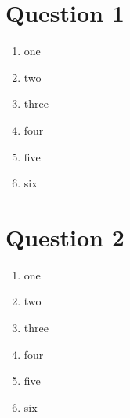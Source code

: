 \documentclass[11pt]{article}
\begin{document}

  \section*{Question 1}

  \begin{enumerate}[label=(\alph*)]

    \item one
    \item two
    \item three
    \item four
    \item five
    \item six

  \end{enumerate}



  \section*{Question 2}

  \begin{enumerate}[label=(\alph*)]

    \item one
    \item two
    \item three
    \item four
    \item five
    \item six

  \end{enumerate}



  
\end{document}
